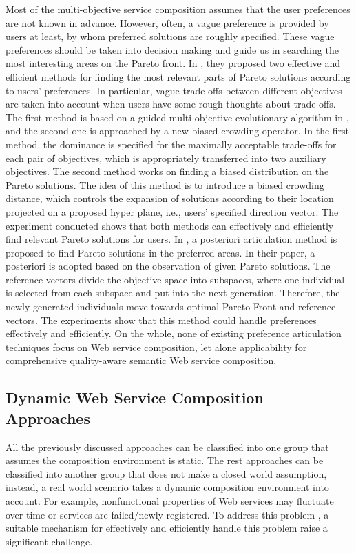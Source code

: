 Most of the multi-objective service composition assumes that the user preferences are not known in advance. However,  often, a vague preference is provided by users at least, by whom preferred solutions are roughly specified.  These vague preferences should be taken into decision making and guide us in searching the most interesting areas on the Pareto front. In \cite{branke2005integrating}, they proposed two effective and efficient methods for finding the most relevant parts of Pareto solutions according to users' preferences. In particular, vague trade-offs between different objectives are taken into account when users have some rough thoughts about trade-offs.  The first method is based on a guided multi-objective evolutionary algorithm in \cite{branke2001guidance}, and the second one is approached by a new biased crowding operator. In the first method, the dominance is specified for the maximally acceptable trade-offs for each pair of objectives, which is appropriately transferred into two auxiliary objectives. The second method works on finding a biased distribution on the Pareto solutions. The idea of this method is to introduce a biased crowding distance, which controls the expansion of solutions according to their location projected on a proposed hyper plane, i.e., users' specified direction vector.  The experiment conducted shows that both methods can effectively and efficiently find relevant Pareto solutions for users. In \cite{cheng2015reference}, a posteriori articulation method is proposed to find Pareto solutions in the preferred areas. In their paper, a posteriori is adopted based on the observation of given Pareto solutions. The reference vectors divide the objective space into subspaces, where one individual is selected from each subspace and put into the next generation. Therefore, the newly generated individuals move towards optimal Pareto Front and reference vectors. The experiments show that this method could handle preferences effectively and efficiently. On the whole, none of existing preference articulation techniques focus on Web service composition, let alone applicability for comprehensive quality-aware semantic Web service composition. 



\subsection{Dynamic Web Service Composition Approaches}\label{dynamicserivce}
All the previously discussed approaches can be classified into one group that assumes the composition environment is static. The rest approaches can be classified into another group that does not make a closed world assumption, instead, a real world scenario takes a dynamic composition environment into account. For example, nonfunctional properties of Web services may fluctuate over time or services are failed/newly registered. To address this problem \cite{nasridinov2012qos},  a suitable mechanism for effectively and efficiently handle this problem raise a significant challenge.

